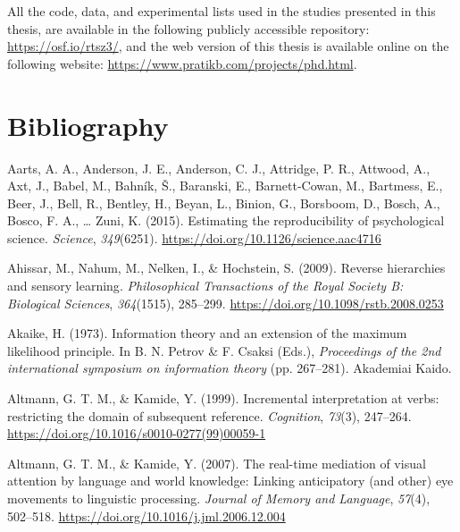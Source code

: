 \documentclass[a4paper, nobind]{templates/ociamthesis}
\newlength{\cslhangindent}
\newenvironment{CSLReferences}[2] %
 {%
  \setlength{\parindent}{0pt}
  \ifodd #1
  \let\oldpar\par
  \def\par{\hangindent=\cslhangindent\oldpar}
  \fi
  \setlength{\parskip}{1mm}
  \setlength{\baselineskip}{6mm}
 }%
 {}
\begin{document}
All the code, data, and experimental lists used in the studies presented in this thesis, are available in the following publicly accessible repository: \url{https://osf.io/rtsz3/},
and the web version of this thesis is available online on the following website:
\url{https://www.pratikb.com/projects/phd.html}.

\hypertarget{bibliography}{%
\chapter*{Bibliography}\label{bibliography}}

\hypertarget{refs}{}
\begin{CSLReferences}{1}{0}
\leavevmode{}%
Aarts, A. A., Anderson, J. E., Anderson, C. J., Attridge, P. R., Attwood, A., Axt, J., Babel, M., Bahník, Š., Baranski, E., Barnett-Cowan, M., Bartmess, E., Beer, J., Bell, R., Bentley, H., Beyan, L., Binion, G., Borsboom, D., Bosch, A., Bosco, F. A., \ldots{} Zuni, K. (2015). {Estimating the reproducibility of psychological science}. \emph{Science}, \emph{349}(6251). \url{https://doi.org/10.1126/science.aac4716}

\leavevmode{}%
Ahissar, M., Nahum, M., Nelken, I., \& Hochstein, S. (2009). {Reverse hierarchies and sensory learning}. \emph{Philosophical Transactions of the Royal Society B: Biological Sciences}, \emph{364}(1515), 285--299. \url{https://doi.org/10.1098/rstb.2008.0253}

\leavevmode{}%
Akaike, H. (1973). Information theory and an extension of the maximum likelihood principle. In B. N. Petrov \& F. Csaksi (Eds.), \emph{Proceedings of the 2nd international symposium on information theory} (pp. 267--281). Akademiai Kaido.

\leavevmode{}%
Altmann, G. T. M., \& Kamide, Y. (1999). Incremental interpretation at verbs: restricting the domain of subsequent reference. \emph{Cognition}, \emph{73}(3), 247--264. \url{https://doi.org/10.1016/s0010-0277(99)00059-1}

\leavevmode{}%
Altmann, G. T. M., \& Kamide, Y. (2007). {The real-time mediation of visual attention by language and world knowledge: Linking anticipatory (and other) eye movements to linguistic processing}. \emph{Journal of Memory and Language}, \emph{57}(4), 502--518. \url{https://doi.org/10.1016/j.jml.2006.12.004}


\end{CSLReferences}
\end{document}
